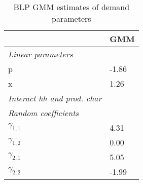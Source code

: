 \begin{table}
\centering
\caption{BLP GMM estimates of demand parameters}
\label{tab:blptDemand}
\begin{tabular}{ll}
\toprule
{} &    GMM \\
\midrule
\emph{Linear parameters}          &        \\
p                                 &  -1.86 \\
x                                 &   1.26 \\
\emph{Interact hh and prod. char} &        \\
\emph{Random coefficients}        &        \\
$\gamma_{1,1}$                    &   4.31 \\
$\gamma_{1,2}$                    &   0.00 \\
$\gamma_{2,1}$                    &   5.05 \\
$\gamma_{2,2}$                    &  -1.99 \\
\bottomrule
\end{tabular}
\end{table}
